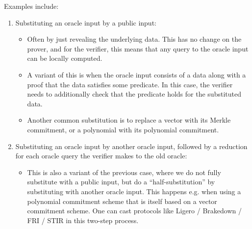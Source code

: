 Examples include:
\begin{enumerate}
    \item Substituting an oracle input by a public input:
    \begin{itemize}
        \item Often by just revealing the underlying data. This has no change on the prover, and for
        the verifier, this means that any query to the oracle input can be locally computed.
        \item A variant of this is when the oracle input consists of a data along with a proof that
        the data satisfies some predicate. In this case, the verifier needs to additionally check
        that the predicate holds for the substituted data.
        \item Another common substitution is to replace a vector with its Merkle commitment, or a
        polynomial with its polynomial commitment.
    \end{itemize}
    \item Substituting an oracle input by another oracle input, followed by a reduction for each
    oracle query the verifier makes to the old oracle:
    \begin{itemize}
        \item This is also a variant of the previous case, where we do not fully substitute with a
        public input, but do a ``half-substitution'' by substituting with another oracle input. This
        happens e.g. when using a polynomial commitment scheme that is itself based on a vector
        commitment scheme. One can cast protocols like Ligero / Brakedown / FRI / STIR in this
        two-step process.
    \end{itemize}
\end{enumerate}